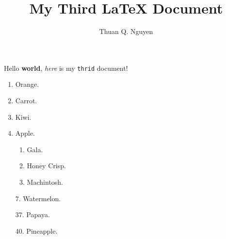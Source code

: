 \documentclass{article}
\begin{document}
\title{My Third \LaTeX{} Document}
\author{Thuan Q. Nguyen}
\maketitle

Hello \textbf{world}, \textit{here} is my \texttt{thrid} document! %

\begin{enumerate}
	\item Orange.
	\item Carrot.
	\item Kiwi.
	\item Apple.
		\begin{enumerate}
		\item Gala.
		\item Honey Crisp.
		\item Machintosh.
		\end{enumerate}
	\item[7.] Watermelon.
	\item[37.] Papaya.
	\item[40.] Pineapple.

\end{enumerate}
\end{document}
